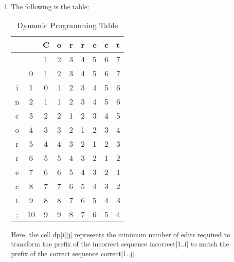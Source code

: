 \documentclass[a4paper]{exam}
\begin{document}
\begin{questions}
\begin{solution}
\begin{enumerate}
        \item The following is the table: \\
        \begin{table}[H]
            \centering
            \caption{Dynamic Programming Table}
            \label{tab:dp_table}
            \begin{tabular}{|c|*{8}{c|}}
                \hline
                \multicolumn{2}{|c|}{} & C & o & r & r & e & c & t \\
                \hline
                \multicolumn{2}{|c|}{} & 1 & 2 & 3 & 4 & 5 & 6 & 7 \\
                \hline
                & 0 & 1 & 2 & 3 & 4 & 5 & 6 & 7 \\
                \cline{2-9}
                i & 1 & 0 & 1 & 2 & 3 & 4 & 5 & 6 \\
                \cline{2-9}
                n & 2 & 1 & 1 & 2 & 3 & 4 & 5 & 6 \\
                \cline{2-9}
                c & 3 & 2 & 2 & 1 & 2 & 3 & 4 & 5 \\
                \cline{2-9}
                o & 4 & 3 & 3 & 2 & 1 & 2 & 3 & 4 \\
                \cline{2-9}
                r & 5 & 4 & 4 & 3 & 2 & 1 & 2 & 3 \\
                \cline{2-9}
                r & 6 & 5 & 5 & 4 & 3 & 2 & 1 & 2 \\
                \cline{2-9}
                e & 7 & 6 & 6 & 5 & 4 & 3 & 2 & 1 \\
                \cline{2-9}
                c & 8 & 7 & 7 & 6 & 5 & 4 & 3 & 2 \\
                \cline{2-9}
                t & 9 & 8 & 8 & 7 & 6 & 5 & 4 & 3 \\
                \cline{2-9}
                ; & 10 & 9 & 9 & 8 & 7 & 6 & 5 & 4 \\
                \hline
            \end{tabular}
        \end{table}
        Here, the cell dp[i][j]  represents the minimum number of edits required to transform the prefix of the incorrect sequence 
        incorrect[1..i] to match the prefix of the correct sequence correct[1..j].
    \end{enumerate}

\end{solution}

\end{questions}
\end{document}
